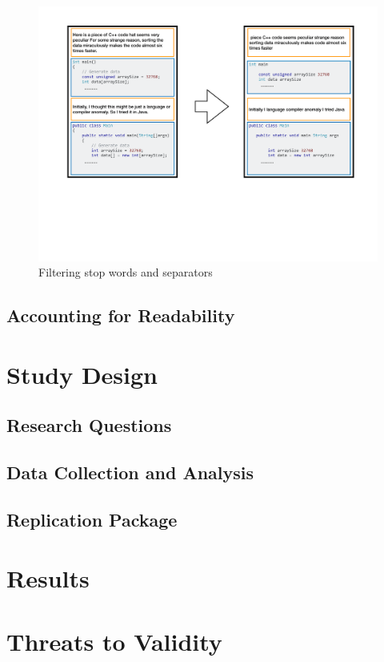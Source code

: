 \documentclass[12pt,mscthesis]{usiinfthesis}
\begin{document}
	\begin{figure}[htbp]
	\centering
	\includegraphics[width=\textwidth]{FilterLM}
	\caption{Filtering stop words and separators}
	\label{FilterLM}
	\end{figure}


	\section{Accounting for Readability}
	
\chapter{Study Design}
	\section{Research Questions}
	\section{Data Collection and Analysis}	
	\section{Replication Package}

\chapter{Results}

\chapter{Threats to Validity}
\end{document}
